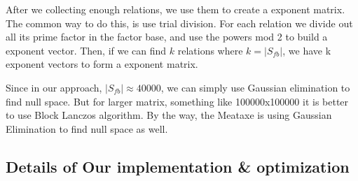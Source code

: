 \documentclass[12pt]{article} %
\begin{document}
After we collecting enough relations, we use them to create a exponent matrix. The common way to do this, is use trial division. For each relation we divide out all its  prime factor in the factor base, and use the powers mod 2 to build a exponent vector. 
Then, if we can find $k$ relations where $k = |S_{fb}|$, we have k exponent vectors to form a exponent matrix. 

Since in our approach, $|S_{fb}|\approx 40000$, we can simply use Gaussian elimination to find null space. But for larger matrix, something like 100000x100000 it is better to use Block Lanczos algorithm. By the way, the Meataxe is using Gaussian Elimination to find null space as well.

\subsection {Details of Our implementation \& optimization}
\end{document}
